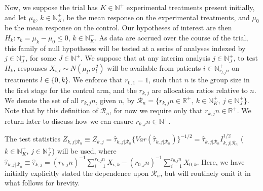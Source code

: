 \documentclass{article}
\numberwithin{equation}{section}
\theoremstyle{plain}
\begin{document}
Now, we suppose the trial has $K \in\mathbb{N}^+$ experimental treatments present initially, and let $\mu_k$, $k\in\mathbb{N}_K^+$, be the mean response on the experimental treatments, and $\mu_0$ be the mean response on the control. Our hypotheses of interest are then
$H_{k} : \tau_k = \mu_k - \mu_0 \le 0$, $k\in\mathbb{N}_K^+$. As data are accrued over the course of the trial, this family of null hypotheses will be tested at a series of analyses indexed by $j\in\mathbb{N}_J^+$, for some $J \in\mathbb{N}^+$. We suppose that at any interim analysis $j\in\mathbb{N}_J^+$, to test $H_{k}$, responses $X_{i,l}\sim N(\mu_l,\sigma_l^2)$ will be available from patients $i\in\mathbb{N}_{r_{l,j}n}^+$ on treatments $l\in\{0,k\}$. We enforce that $r_{0,1}=1$, such that $n$ is the group size in the first stage for the control arm, and the $r_{k,j}$ are allocation ratios relative to $n$. We denote the set of all $r_{k,j}n$, given $n$, by $\mathscr{R}_n=\{r_{k,j}n\in\mathbb{R}^+,\ k\in\mathbb{N}_K^+,\ j\in\mathbb{N}_J^+\}$. Note that by this definition of $\mathscr{R}_n$, for now we require only that $r_{k,j}n\in\mathbb{R}^+$. We return later to discuss how we can ensure $r_{k,j}n\in\mathbb{N}^+$.

The test statistics $Z_{k,j|\mathscr{R}_n}\equiv Z_{k,j}=\hat{\tau}_{k,j|\mathscr{R}_n}\{Var(\hat{\tau}_{k,j|\mathscr{R}_n})\}^{-1/2}=\hat{\tau}_{k,j|\mathscr{R}_n}I_{k,j|\mathscr{R}_n}^{1/2}$ ($k\in\mathbb{N}_K^+$, $j\in\mathbb{N}_J^+$) will be used, where $\hat{\tau}_{k,j|\mathscr{R}_n}\equiv \hat{\tau}_{k,j} = (r_{k,j}n)^{-1}\sum_{i=1}^{r_{k,j}n}X_{i,k} - (r_{0,j}n)^{-1}\sum_{i=1}^{r_{0,j}n}X_{0,k}$. Here, we have initially explicitly stated the dependence upon $\mathscr{R}_n$, but will routinely omit it in what follows for brevity.
\end{document}
